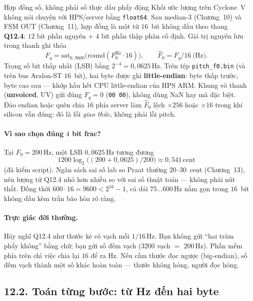 \begin{firstprin}{Hợp đồng số, không phải số thực dấu phẩy động}
Khối ước lượng trên Cyclone~V không nói chuyện với HPS/server bằng \texttt{float64}. Sau median-3 (Chương~10) và FSM OUT (Chương~11), hợp đồng là một từ $16$~bit không dấu theo thang \textbf{Q12.4}: $12$ bit phần nguyên + $4$ bit phần thập phân cố định. Giá trị nguyên lưu trong thanh ghi thỏa
\begin{equation}
\label{eq:ch12_q124}
F_q = \mathrm{sat}_{0..9600}\!\bigl(\mathrm{round}(F_0^{\mathrm{Hz}}\cdot 16)\bigr),
\qquad
\hat F_0 = F_q / 16\ \text{(Hz)}.
\end{equation}
Trọng số bit thấp nhất (LSB) bằng $2^{-4}=0{,}0625\,\text{Hz}$. Trên tệp \texttt{pitch\_f0.bin} (và trên bus Avalon-ST $16$~bit), hai byte được ghi \textbf{little-endian}: byte thấp trước, byte cao sau --- khớp hầu hết CPU little-endian của HPS ARM. Khung vô thanh (\textbf{unvoiced}, UV) gửi đúng $F_q=0$ (\texttt{00 00}), không dùng NaN hay mã đặc biệt. Đảo endian hoặc quên chia $16$ phía server làm $\hat F_0$ lệch $\times 256$ hoặc $\times 16$ trong khi silicon vẫn đúng: đó là lỗi \emph{giao thức}, không phải lỗi pitch.
\end{firstprin}

\paragraph{Vì sao chọn đúng $4$ bit frac?} Tại $F_0=200\,\text{Hz}$, một LSB $0{,}0625\,\text{Hz}$ tương đương
\[
1200\log_2\bigl((200+0{,}0625)/200\bigr)\approx 0{,}541\,\text{cent}
\]
(đã kiểm script). Ngân sách sai số lab so Praat thường $20$--$30$~cent (Chương~13), nên lượng tử Q12.4 nhỏ hơn nhiều so với sai số thuật toán --- không phải nút thắt. Đồng thời $600\cdot 16=9600 < 2^{16}-1$, cả dải $75\ldots 600\,\text{Hz}$ nằm gọn trong $16$~bit không dấu kèm trần bão hòa rõ ràng.

\paragraph{Trực giác đời thường.} Hãy nghĩ Q12.4 như thước kẻ có vạch mỗi $1/16\,\text{Hz}$. Bạn không gửi ``hai trăm phẩy không'' bằng chữ; bạn gửi số đếm vạch ($3200$ vạch $=$ $200\,\text{Hz}$). Phần mềm phía trên chỉ việc chia lại $16$ để ra Hz. Nếu cầm thước đọc ngược (big-endian), số đếm vạch thành một số khác hoàn toàn --- thước không hỏng, người đọc hỏng.

\subsection*{12.2. Toán từng bước: từ Hz đến hai byte}

